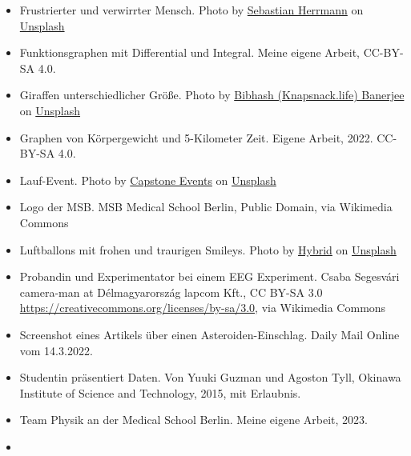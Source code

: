 \documentclass{beamer}
\begin{document}
\begin{frame}
\begin{tiny}
\begin{itemize}
\item
Frustrierter und verwirrter Mensch. Photo by \href{https://unsplash.com/@officestock?utm_source=unsplash&utm_medium=referral&utm_content=creditCopyText}{Sebastian Herrmann} on \href{https://unsplash.com/s/photos/frustration?utm_source=unsplash&utm_medium=referral&utm_content=creditCopyText}{Unsplash}

\item
Funktionsgraphen mit Differential und Integral. Meine eigene Arbeit, CC-BY-SA 4.0.


\item
Giraffen unterschiedlicher Größe. Photo by \href{https://unsplash.com/@perventuator?utm_source=unsplash&utm_medium=referral&utm_content=creditCopyText}{Bibhash (Knapsnack.life) Banerjee} on \href{https://unsplash.com/s/photos/giraffe?utm_source=unsplash&utm_medium=referral&utm_content=creditCopyText}{Unsplash}
  


\item
Graphen von Körpergewicht und 5-Kilometer Zeit. Eigene Arbeit, 2022. CC-BY-SA 4.0.
  \item
Lauf-Event. Photo by \href{https://unsplash.com/@capstoneeventgroup?utm_source=unsplash&utm_medium=referral&utm_content=creditCopyText}{Capstone Events} on \href{https://unsplash.com/s/photos/marathon?utm_source=unsplash&utm_medium=referral&utm_content=creditCopyText}{Unsplash}
\item
Logo der MSB. MSB Medical School Berlin, Public Domain, via Wikimedia Commons

\item
Luftballons mit frohen und traurigen Smileys. Photo by \href{https://unsplash.com/@artbyhybrid?utm_source=unsplash&utm_medium=referral&utm_content=creditCopyText}{Hybrid} on \href{https://unsplash.com/s/photos/feedback?utm_source=unsplash&utm_medium=referral&utm_content=creditCopyText}{Unsplash}

\item
Probandin und Experimentator bei einem EEG Experiment. Csaba Segesvári camera-man at Délmagyarország lapcom Kft., CC BY-SA 3.0 \url{https://creativecommons.org/licenses/by-sa/3.0}, via Wikimedia Commons



\item
Screenshot eines Artikels über einen Asteroiden-Einschlag. Daily Mail Online vom 14.3.2022.
\item
Studentin präsentiert Daten. Von Yuuki Guzman und Agoston Tyll, Okinawa Institute of Science and Technology, 2015, mit Erlaubnis. 
\item
Team Physik an der Medical School Berlin. Meine eigene Arbeit, 2023.
\item


\end{itemize}
\end{tiny}
\end{frame}
\end{document}
